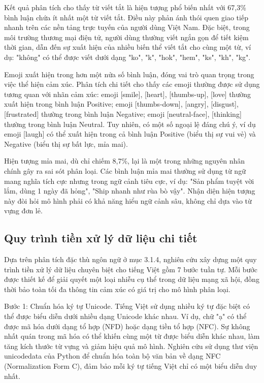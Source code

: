 \documentclass[14pt, a4paper]{report}
\begin{document}
Kết quả phân tích cho thấy từ viết tắt là hiện tượng phổ biến nhất với 67,3\% bình luận chứa ít nhất một từ viết tắt. Điều này phản ánh thói quen giao tiếp nhanh trên các nền tảng trực tuyến của người dùng Việt Nam. Đặc biệt, trong môi trường thương mại điện tử, người dùng thường viết ngắn gọn để tiết kiệm thời gian, dẫn đến sự xuất hiện của nhiều biến thể viết tắt cho cùng một từ, ví dụ: "không" có thể được viết dưới dạng "ko", "k", "hok", "hem", "ks", "kh", "kg".


Emoji xuất hiện trong hơn một nửa số bình luận, đóng vai trò quan trọng trong việc thể hiện cảm xúc. Phân tích chi tiết cho thấy các emoji thường được sử dụng tương quan với nhãn cảm xúc: emoji [smile], [heart], [thumbs-up], [love] thường xuất hiện trong bình luận Positive; emoji [thumbs-down], [angry], [disgust], [frustrated] thường trong bình luận Negative; emoji [neutral-face], [thinking] thường trong bình luận Neutral. Tuy nhiên, có một số ngoại lệ đáng chú ý, ví dụ emoji [laugh] có thể xuất hiện trong cả bình luận Positive (biểu thị sự vui vẻ) và Negative (biểu thị sự bất lực, mỉa mai).


Hiện tượng mỉa mai, dù chỉ chiếm 8,7\%, lại là một trong những nguyên nhân chính gây ra sai sót phân loại. Các bình luận mỉa mai thường sử dụng từ ngữ mang nghĩa tích cực nhưng trong ngữ cảnh tiêu cực, ví dụ: "Sản phẩm tuyệt vời lắm, dùng 1 ngày đã hỏng", "Ship nhanh như rùa bò vậy". Nhận diện hiện tượng này đòi hỏi mô hình phải có khả năng hiểu ngữ cảnh sâu, không chỉ dựa vào từ vựng đơn lẻ.


\subsection{Quy trình tiền xử lý dữ liệu chi tiết}


Dựa trên phân tích đặc thù ngôn ngữ ở mục 3.1.4, nghiên cứu xây dựng một quy trình tiền xử lý dữ liệu chuyên biệt cho tiếng Việt gồm 7 bước tuần tự. Mỗi bước được thiết kế để giải quyết một loại nhiễu cụ thể trong dữ liệu mạng xã hội, đồng thời bảo toàn tối đa thông tin cảm xúc có giá trị cho mô hình phân loại.


Bước 1: Chuẩn hóa ký tự Unicode. Tiếng Việt sử dụng nhiều ký tự đặc biệt có thể được biểu diễn dưới nhiều dạng Unicode khác nhau. Ví dụ, chữ "ạ" có thể được mã hóa dưới dạng tổ hợp (NFD) hoặc dạng tiền tổ hợp (NFC). Sự không nhất quán trong mã hóa có thể khiến cùng một từ được biểu diễn khác nhau, làm tăng kích thước từ vựng và giảm hiệu quả mô hình. Nghiên cứu sử dụng thư viện unicodedata của Python để chuẩn hóa toàn bộ văn bản về dạng NFC (Normalization Form C), đảm bảo mỗi ký tự tiếng Việt chỉ có một biểu diễn duy nhất.
\end{document}

